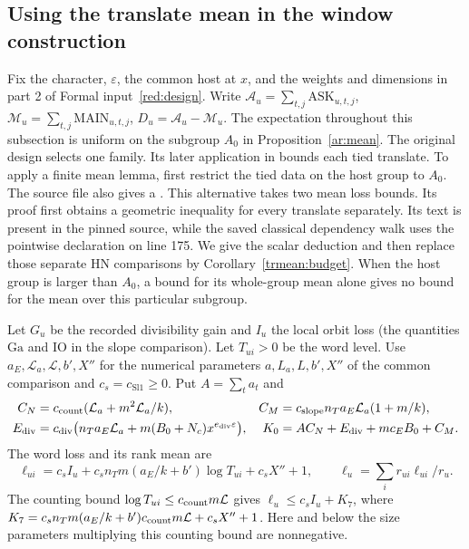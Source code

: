 \subsection{Using the translate mean in the window construction}\label{red:translate}

Fix the character, \(\varepsilon\), the common host at \(x\), and the
weights and dimensions in part 2 of Formal input~\ref{red:design}.
Write \(\mathcal A_u=\sum_{t,j}\mathrm{ASK}_{u,t,j}\),
\(\mathcal M_u=\sum_{t,j}\mathrm{MAIN}_{u,t,j}\),
\(D_u=\mathcal A_u-\mathcal M_u\). The expectation throughout this
subsection is uniform on the subgroup \(A_0\) in
Proposition~\ref{ar:mean}. The original design  selects
one family. Its later application in  bounds each tied translate. To apply a finite mean lemma, first restrict the tied data on the host group to \(A_0\).
The source file also gives a
.
This alternative takes two mean loss bounds. Its proof first obtains
a geometric inequality for every translate separately. Its text is
present in the pinned source, while the saved classical dependency
walk uses the pointwise declaration on line 175. We give the scalar
deduction and then replace those separate HN comparisons by
Corollary~\ref{trmean:budget}. When the host group is larger than
\(A_0\), a bound for its whole-group mean alone gives no bound for
the mean over this particular subgroup.

Let \(G_u\) be the recorded divisibility gain and \(I_u\) the
local orbit loss (the quantities \(\mathrm{Ga}\) and \(\mathrm{IO}\)
in the slope comparison). Let \(T_{ui}>0\) be the word level.
Use \(a_E,\mathcal L_a,\mathcal L,b',X''\) for the numerical
parameters \(a,L_a,L,b',X''\) of the common comparison and
\(c_s=c_{\mathrm{Sl1}}\ge0\). Put \(A=\sum_t a_t\) and
\[
\begin{aligned}
 C_N&=c_{\rm count}(\mathcal L_a+m^2\mathcal L_a/k),&
 C_M&=c_{\rm slope} n_Ta_E\mathcal L_a(1+m/k),\\
 E_{\rm div}&=c_{\rm div}\big(n_Ta_E\mathcal L_a+
                       m(B_0+N_c)x^{e_{\rm div}\varepsilon}\big),&
 K_0&=A C_N+E_{\rm div}+mc_EB_0+C_M.
\end{aligned}
\]
The word loss and its rank mean are
\[
 \ell_{ui}=c_s I_u+c_s n_Tm(a_E/k+b')\log T_{ui}+c_sX''+1,
 \qquad \ell_u=\sum_i r_{ui}\ell_{ui}/r_u .
\]
The counting bound \(\log T_{ui}\le c_{\rm count}m\mathcal L\) gives
\(\ell_u\le c_s I_u+K_7\), where
\(K_7=c_s n_Tm(a_E/k+b')c_{\rm count}m\mathcal L+c_sX''+1\).
Here and below the size parameters multiplying this counting bound
are nonnegative.

